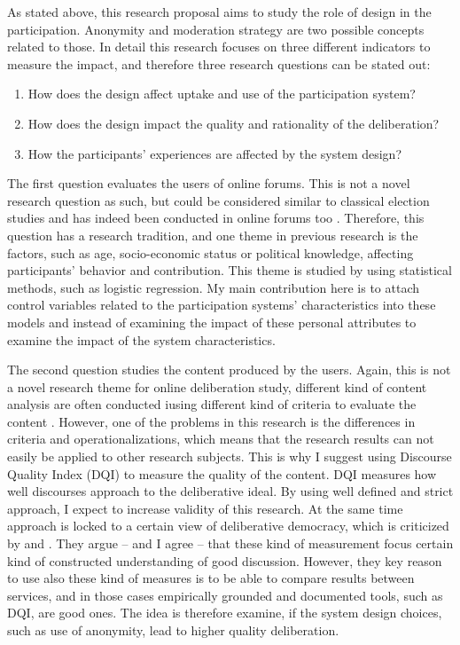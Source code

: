 \documentclass{article}
\begin{document}
As stated above, this research proposal aims to study the role of design in the participation. Anonymity and moderation strategy are two possible concepts related to those. In detail this research focuses on three different indicators to measure the impact, and therefore three research questions can be stated out:

\begin{enumerate}
\item How does the design affect uptake and use of the participation system?
\item How does the design impact the quality and rationality of the deliberation?
\item How the participants' experiences are affected by the system design?
\end{enumerate}

The first question evaluates the users of online forums. This is not a novel research question as such, but could be considered similar to classical election studies and has indeed been conducted in online forums too . Therefore, this question has a research tradition, and one theme in previous research is the factors, such as age, socio-economic status or political knowledge, affecting participants' behavior and contribution. This theme is studied by using statistical methods, such as logistic regression. My main contribution here is to attach control variables related to the participation systems' characteristics into these models and instead of examining the impact of these personal attributes to examine the impact of the system characteristics.

The second question studies the content produced by the users. Again, this is not a novel research theme for online deliberation study, different kind of content analysis are often conducted iusing different kind of criteria to evaluate the content \cite{pietila02,y,z}. However, one of the problems in this research is the differences in criteria and operationalizations, which means that the research results can not easily be applied to other research subjects. This is why I suggest using   Discourse Quality Index (DQI) to measure the quality of the content. DQI measures how well discourses approach to the deliberative ideal. By using well defined and strict approach, I expect to increase validity of this research. At the same time  approach is locked to a certain view of deliberative democracy, which is criticized by  and . They argue -- and I agree -- that these kind of measurement focus certain kind of constructed understanding of good discussion. However, they key reason to use also these kind of measures is to be able to compare results between services, and in those cases empirically grounded and documented tools, such as DQI, are good ones. The idea is therefore examine, if the system design choices, such as use of anonymity, lead to higher quality deliberation.
\end{document}
